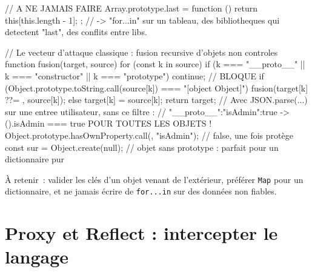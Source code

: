 \begin{codejs}
// A NE JAMAIS FAIRE
Array.prototype.last = function () { return this[this.length - 1]; };
//   -> "for...in" sur un tableau, des bibliotheques qui detectent "last", des conflits entre libs.

// Le vecteur d'attaque classique : fusion recursive d'objets non controles
function fusion(target, source) {
  for (const k in source) {
    if (k === "__proto__" || k === "constructor" || k === "prototype") continue;   // BLOQUE
    if (Object.prototype.toString.call(source[k]) === "[object Object]") {
      fusion(target[k] ??= {}, source[k]);
    } else target[k] = source[k];
  }
  return target;
}
// Avec JSON.parse(...) sur une entree utilisateur, sans ce filtre :
//   {"__proto__":{"isAdmin":true}}   ->   ({}).isAdmin === true  POUR TOUTES LES OBJETS !
Object.prototype.hasOwnProperty.call({}, "isAdmin");     // false, une fois prot\`ege
const sur = Object.create(null);        // objet sans prototype : parfait pour un dictionnaire pur
\end{codejs}

\`A retenir~: valider les cl\'es d'un objet venant de l'ext\'erieur, pr\'ef\'erer \texttt{Map} pour
un dictionnaire, et ne jamais \'ecrire de \texttt{for...in} sur des donn\'ees non fiables.

\section{Proxy et Reflect : intercepter le langage}

